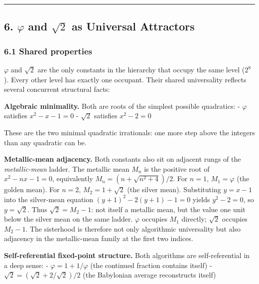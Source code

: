 \documentclass[
  11pt,
  letterpaper,
]{article}
\begin{document}
\begin{center}\rule{0.5\linewidth}{0.5pt}\end{center}

\subsection{\texorpdfstring{6. \(\varphi\) and \(\sqrt{2}\) as Universal
Attractors}{6. \textbackslash varphi and \textbackslash sqrt\{2\} as Universal Attractors}}\label{varphi-and-sqrt2-as-universal-attractors}

\subsubsection{6.1 Shared properties}\label{shared-properties}

\(\varphi\) and \(\sqrt{2}\) are the only constants in the hierarchy
that occupy the same level (\(2^8\)). Every other level has exactly one
occupant. Their shared universality reflects several concurrent
structural facts:

\textbf{Algebraic minimality.} Both are roots of the simplest possible
quadratics: - \(\varphi\) satisfies \(x^2 - x - 1 = 0\) - \(\sqrt{2}\)
satisfies \(x^2 - 2 = 0\)

These are the two minimal quadratic irrationals: one more step above the
integers than any quadratic can be.

\textbf{Metallic-mean adjacency.} Both constants also sit on adjacent
rungs of the \emph{metallic-mean} ladder. The metallic mean \(M_n\) is
the positive root of \(x^2 - nx - 1 = 0\), equivalently
\(M_n = (n + \sqrt{n^2 + 4})/2\). For \(n = 1\), \(M_1 = \varphi\) (the
golden mean). For \(n = 2\), \(M_2 = 1 + \sqrt{2}\) (the silver mean).
Substituting \(y = x - 1\) into the silver-mean equation
\((y+1)^2 - 2(y+1) - 1 = 0\) yields \(y^2 - 2 = 0\), so
\(y = \sqrt{2}\). Thus \(\sqrt{2} = M_2 - 1\): not itself a metallic
mean, but the value one unit below the silver mean on the same ladder.
\(\varphi\) occupies \(M_1\) directly; \(\sqrt{2}\) occupies
\(M_2 - 1\). The sisterhood is therefore not only algorithmic
universality but also adjacency in the metallic-mean family at the first
two indices.

\textbf{Self-referential fixed-point structure.} Both algorithms are
self-referential in a deep sense: - \(\varphi = 1 + 1/\varphi\) (the
continued fraction contains itself) -
\(\sqrt{2} = (\sqrt{2} + 2/\sqrt{2})/2\) (the Babylonian average
reconstructs itself)
\end{document}
